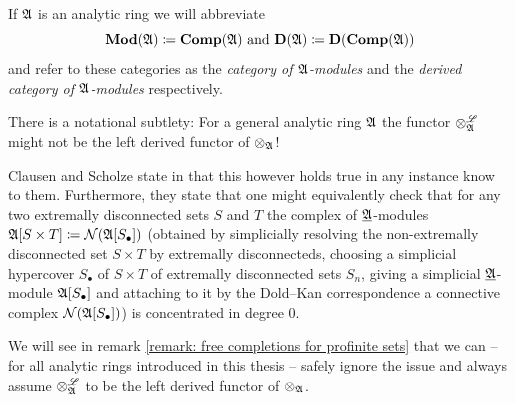 \begin{notation}
	If ${\mathfrak{A}}$ is an analytic ring we will abbreviate
		$${{\mathbf{Mod}}({\mathfrak{A}})}\coloneqq {{\mathbf{Comp}}({\mathfrak{{\mathfrak{A}}}})}\text{ and }{{\mathbf{D}}({\mathfrak{A}})}\coloneqq {{\mathbf{D}}({{\mathbf{Comp}}({\mathfrak{A}})})}$$
	and refer to these categories as the \emph{category of ${\mathfrak{A}}$-modules} and the \emph{derived category of ${\mathfrak{A}}$-modules} respectively.
\end{notation}

\begin{remark}
	\label{remark: when is the tensor product the derived tensor product?}
	
	There is a notational subtlety: For a general analytic ring ${\mathfrak{A}}$ the functor $\otimes^{\mathscr{L}}_{\mathfrak{A}}$ might not be the left derived functor of $\otimes_{\mathfrak{A}}$!
	
	Clausen and Scholze state in \cite[Warning 7.6]{condenseddotpdf} that this however holds true in any instance know to them. Furthermore, they state that one might equivalently check that for any two extremally disconnected sets $S$ and $T$ the complex of ${\underline{{\mathfrak{A}}}}$-modules ${{{\mathfrak{A}}[S\times T]}}\coloneqq {{\mathcal N}({{{\mathfrak{A}}[S_\bullet]}})}$ (obtained by simplicially resolving the non-extremally disconnected set $S\times T$ by extremally disconnecteds, \ie choosing a simplicial hypercover $S_\bullet$ of $S\times T$ of extremally disconnected sets $S_n$, giving a simplicial ${\underline{{\mathfrak{A}}}}$-module ${{{\mathfrak{A}}[S_\bullet]}}$ and attaching to it by the Dold--Kan correspondence a connective complex ${{\mathcal N}({{{\mathfrak{A}}[S_\bullet]}})}$) is concentrated in degree $0$.
	
	We will see in remark \ref{remark: free completions for profinite sets} that we can -- for all analytic rings introduced in this thesis -- safely ignore the issue and always assume $\otimes^{\mathscr{L}}_{\mathfrak{A}}$ to be the left derived functor of $\otimes_{\mathfrak{A}}$.
\end{remark}

